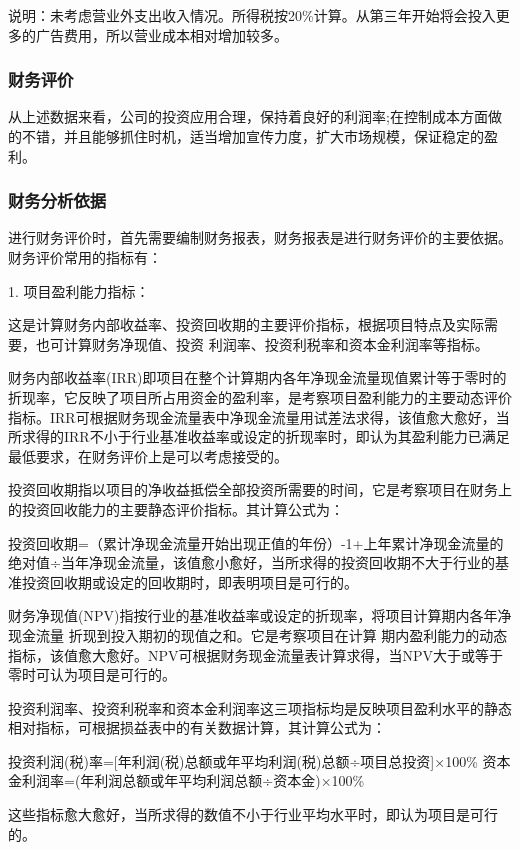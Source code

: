 \documentclass[10pt,letterpaper]{article}
\begin{document}
说明：未考虑营业外支出收入情况。所得税按20\%计算。从第三年开始将会投入更多的广告费用，所以营业成本相对增加较多。

\subsubsection{财务评价}
从上述数据来看，公司的投资应用合理，保持着良好的利润率;在控制成本方面做的不错，并且能够抓住时机，适当增加宣传力度，扩大市场规模，保证稳定的盈利。

\subsubsection{财务分析依据}

进行财务评价时，首先需要编制财务报表，财务报表是进行财务评价的主要依据。财务评价常用的指标有：

1.	项目盈利能力指标：

这是计算财务内部收益率、投资回收期的主要评价指标，根据项目特点及实际需要，也可计算财务净现值、投资 利润率、投资利税率和资本金利润率等指标。

财务内部收益率(IRR)即项目在整个计算期内各年净现金流量现值累计等于零时的折现率，它反映了项目所占用资金的盈利率，是考察项目盈利能力的主要动态评价指标。IRR可根据财务现金流量表中净现金流量用试差法求得，该值愈大愈好，当所求得的IRR不小于行业基准收益率或设定的折现率时，即认为其盈利能力已满足最低要求，在财务评价上是可以考虑接受的。

投资回收期指以项目的净收益抵偿全部投资所需要的时间，它是考察项目在财务上的投资回收能力的主要静态评价指标。其计算公式为：

投资回收期=（累计净现金流量开始出现正值的年份）-1+上年累计净现金流量的绝对值÷当年净现金流量，该值愈小愈好，当所求得的投资回收期不大于行业的基准投资回收期或设定的回收期时，即表明项目是可行的。

财务净现值(NPV)指按行业的基准收益率或设定的折现率，将项目计算期内各年净现金流量 折现到投入期初的现值之和。它是考察项目在计算 期内盈利能力的动态指标，该值愈大愈好。NPV可根据财务现金流量表计算求得，当NPV大于或等于零时可认为项目是可行的。

投资利润率、投资利税率和资本金利润率这三项指标均是反映项目盈利水平的静态相对指标，可根据损益表中的有关数据计算，其计算公式为：

投资利润(税)率=[年利润(税)总额或年平均利润(税)总额÷项目总投资]×100\%
资本金利润率=(年利润总额或年平均利润总额÷资本金)×100\%

这些指标愈大愈好，当所求得的数值不小于行业平均水平时，即认为项目是可行的。
\end{document}

